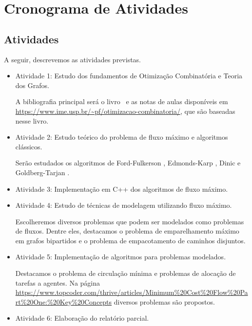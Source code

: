 \documentclass{amsart}
\begin{document}
\section{Cronograma de Atividades}
\subsection{Atividades}
\label{sec:ativ}
A seguir, descrevemos as atividades previstas.
\begin{itemize}
    \item Atividade 1: Estudo dos fundamentos de Otimização Combinatória e Teoria dos Grafos.

    A bibliografia principal será o livro~\cite{cook1998combinatorial} e as notas de aulas disponíveis em \url{https://www.ime.usp.br/~pf/otimizacao-combinatoria/}, que são baseadas nesse livro.

    \item Atividade 2: Estudo teórico do problema de fluxo máximo e algoritmos clássicos.

    Serão estudados os algoritmos de Ford-Fulkerson \cite{ford1956maximal}, Edmonds-Karp \cite{edmonds1972theoretical}, Dinic \cite{dinic1970algorithm} e Goldberg-Tarjan \cite{goldberg1988new}.

    \item Atividade 3: Implementação em C++ dos algoritmos de fluxo máximo.

    \item Atividade 4: Estudo de técnicas de modelagem utilizando fluxo máximo.

    Escolheremos diversos problemas que podem ser modelados como problemas de fluxos. Dentre eles, destacamos o problema de emparelhamento máximo em grafos bipartidos e o problema de empacotamento de caminhos disjuntos.

    \item Atividade 5: Implementação de algoritmos para problemas modelados.

    Destacamos o problema de circulação mínima e problemas de alocação de tarefas a agentes. Na página \url{https://www.topcoder.com/thrive/articles/Minimum%20Cost%20Flow%20Part%20One:%20Key%20Concepts} diversos problemas são propostos.

    \item Atividade 6: Elaboração do relatório parcial.


\end{itemize}
\end{document}
